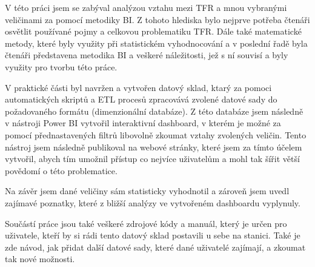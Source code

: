 \documentclass[thesis=M,czech]{FITthesis}[2022/10/08]
\begin{document}
\begin{conclusion}
	V této práci jsem se zabýval analýzou vztahu mezi TFR a mnou vybranými veličinami za pomocí metodiky BI. Z tohoto hlediska bylo nejprve potřeba čtenáři osvětlit používané pojmy a celkovou problematiku TFR. Dále také matematické metody, které byly využity při statistickém vyhodnocování a v poslední řadě byla čtenáři představena metodika BI a veškeré náležitosti, jež s ní souvisí a byly využity pro tvorbu této práce.
	
V praktické části byl navržen a vytvořen datový sklad, ktarý za pomoci automatických skriptů a ETL procesů zpracovává zvolené datové sady do požadovaného formátu (dimenzionální databáze). Z této databáze jsem následně v nástroji Power BI vytvořil interaktivní dashboard, v kterém je možné za pomocí přednastavených filtrů libovolně zkoumat vztahy zvolených veličin. Tento nástroj jsem následně publikoval na webové stránky, které jsem za tímto účelem vytvořil, abych tím umožnil přístup co nejvíce uživatelům a mohl tak šířit větší povědomí o této problematice.

Na závěr jsem dané veličiny sám statisticky vyhodnotil a zároveň jsem uvedl zajímavé poznatky, které z bližší analýzy ve vytvořeném dashboardu vyplynuly.

Součástí práce jsou také veškeré zdrojové kódy a manuál, který je určen pro uživatele, kteří by si rádi tento datový sklad postavili u sebe na stanici. Také je zde návod, jak přidat další datové sady, které dané uživatelé zajímají, a zkoumat tak nové možnosti.

\end{conclusion}
\end{document}
